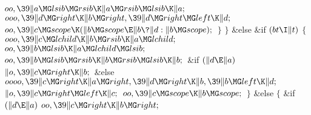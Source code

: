 ${}\\{oo},\39\|a\MG\\{lsib}\MG\\{rsib}\K\|a\MG\\{rsib}\MG\\{lsib}\K\|a;{}$\6
${}\\{ooo},\39\|d\MG\\{right}\K\|b\MG\\{right},\39\|d\MG\\{right}\MG\\{left}\K%
\|d;{}$\6
${}\\{oo},\39\|c\MG\\{scope}\K(\|b\MG\\{scope}\E\|b\?\|d:\|b\MG\\{scope});{}$\6
\4${}\}{}$\2\6
\4${}\}{}$\5
\2\&{else} \&{if} ${}(\\{bt}\I\|t){}$\5
${}\{{}$\1\6
${}\\{ooo},\39\|c\MG\\{lchild}\K\|b\MG\\{rsib}\K\|a\MG\\{lchild};{}$\6
${}\\{oo},\39\|b\MG\\{lsib}\K\|a\MG\\{lchild}\MG\\{lsib};{}$\6
${}\\{oo},\39\|b\MG\\{lsib}\MG\\{rsib}\K\|b\MG\\{rsib}\MG\\{lsib}\K\|b;{}$\6
\&{if} ${}(\|d\E\|a){}$\1\5
${}\|o,\39\|c\MG\\{right}\K\|b;{}$\2\6
\&{else}\1\5
${}\\{oooo},\39\|c\MG\\{right}\K\|a\MG\\{right},\39\|d\MG\\{right}\K\|b,\39\|b%
\MG\\{left}\K\|d;{}$\2\6
${}\|o,\39\|c\MG\\{right}\MG\\{left}\K\|c;{}$\6
${}\\{oo},\39\|c\MG\\{scope}\K\|b\MG\\{scope};{}$\6
\4${}\}{}$\5
\2\&{else}\5
${}\{{}$\1\6
\&{if} ${}(\|d\E\|a){}$\1\5
${}\\{oo},\39\|c\MG\\{right}\K\|b\MG\\{right};{}$\2\6
